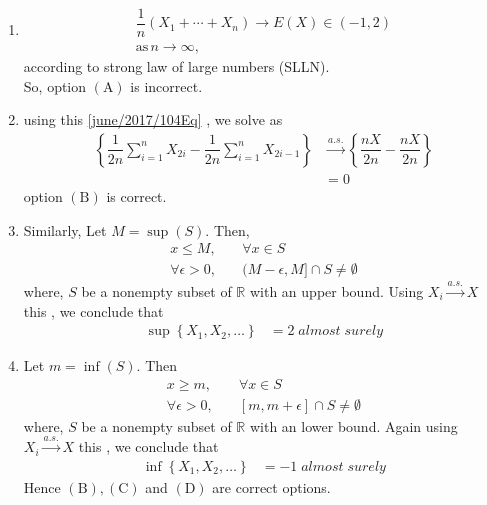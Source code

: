 \begin{enumerate}[label=\alph*)]
\item\begin{align}
\dfrac{1}{n}\left(X_{1}+\cdots+X_{n}\right) \rightarrow E(X)\in(-1,2)\\
\text{as} \, n\rightarrow\infty,
\end{align}
according to strong law of large numbers (SLLN).\\
So, option $(\mathrm{A})$ is incorrect.
\item using this \ref{june/2017/104Eq} , we solve as
\begin{align}
\left\{\dfrac{1}{2 n} \sum_{i=1}^{n} X_{2 i}-\dfrac{1}{2 n} \sum_{i=1}^{n} X_{2 i-1}\right\}&\stackrel{a.s.}{\rightarrow}\left\{\dfrac{nX}{2 n}-\dfrac{nX}{2 n}\right\}\\
&=0
\end{align}
option $(\mathrm{B})$ is correct.
\item  Similarly, Let $M=\sup (S) .$ Then,
\begin{align}
x \leq M, &\quad \forall x \in S \\
\forall \epsilon>0,& \quad(M-\epsilon, M] \cap S \neq \emptyset
\end{align}
where, $S$ be a nonempty subset of $\mathbb{R}$ with an upper bound. Using $X_i \stackrel{a.s.}{\rightarrow} X$ this , we  conclude that
\begin{align}
\sup \left\{X_{1}, X_{2}, \ldots\right\}&=2 \;almost\; surely
\end{align}
\item Let $m=\inf (S)$. Then
\begin{align}
x \geq m, & \quad \forall x \in S \\
\forall \epsilon>0, &\quad {[m, m+\epsilon] \cap S \neq \emptyset}
\end{align}
where, $S$ be a nonempty subset of $\mathbb{R}$ with an lower bound. Again using $X_i \stackrel{a.s.}{\rightarrow} X$ this , we conclude that
\begin{align}
\inf \left\{X_{1}, X_{2}, \ldots\right\}&=-1 \;almost\; surely
\end{align}
Hence $(\mathrm{B}),(\mathrm{C})$ and $(\mathrm{D})$ are correct options.
\end{enumerate}